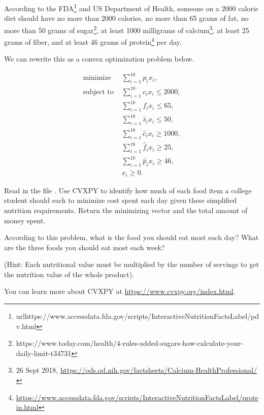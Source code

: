 According to the FDA\footnote[1]{url{https://www.accessdata.fda.gov/scripts/InteractiveNutritionFactsLabel/pdv.html}} and US Department of Health, someone on a $2000$ calorie diet should have no more than 2000 calories, no more than 65 grams of fat, no more than 50 grams of sugar\footnote[2]{https://www.today.com/health/4-rules-added-sugars-how-calculate-your-daily-limit-t34731}, at least 1000 milligrams of calcium\footnote[1]{26 Sept 2018, \url{https://ods.od.nih.gov/factsheets/Calcium-HealthProfessional/}}, at least 25 grams of fiber, and at least 46 grams of protein\footnote[2]{\url{https://www.accessdata.fda.gov/scripts/InteractiveNutritionFactsLabel/protein.html}} per day.

 We can rewrite this as a convex optimization problem below.

 \begin{align*}
\text{minimize } & \sum_{i=1}^{18}p_ix_i, \\
\text{subject to }& \sum_{i=1}^{18} c_ix_i \leq 2000, \\
			& \sum_{i=1}^{18} f_ix_i \leq 65, \\
			& \sum_{i=1}^{18} \hat{s}_ix_i \leq 50, \\
			& \sum_{i=1}^{18} \hat{c}_ix_i \geq 1000, \\
			& \sum_{i=1}^{18} \hat{f}_ix_i \geq 25, \\
			& \sum_{i=1}^{18} \hat{p}_ix_i \geq 46, \\
			& x_i \geq 0.
\end{align*}

 \begin{problem}
Read in the file .
Use CVXPY to identify how much of each food item a college student should each to minimize cost spent each day given these simplified nutrition requirements.
Return the minimizing vector and the total amount of money spent.

According to this problem, what is the food you should eat most each day? 
What are the three foods you should eat most each week?

(Hint: Each nutritional value must be multiplied by the number of servings to get the nutrition value of the whole product).
\label{prob:diet}
\end{problem}

You can learn more about CVXPY at
\url{https://www.cvxpy.org/index.html}.
